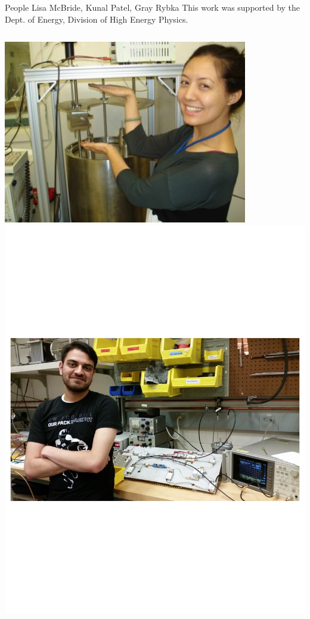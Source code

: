 \documentclass{beamer}
\begin{document}
\begin{frame}{People}
{Lisa McBride, Kunal Patel, Gray Rybka}
{\tiny This work was supported by the Dept. of Energy, Division of High Energy Physics.}

\begin{columns}
\includegraphics[width=0.8\textwidth]{lisa_pic}
\includegraphics[width=\textwidth]{kunal_pic}


\end{columns}
\end{frame}
\end{document}
